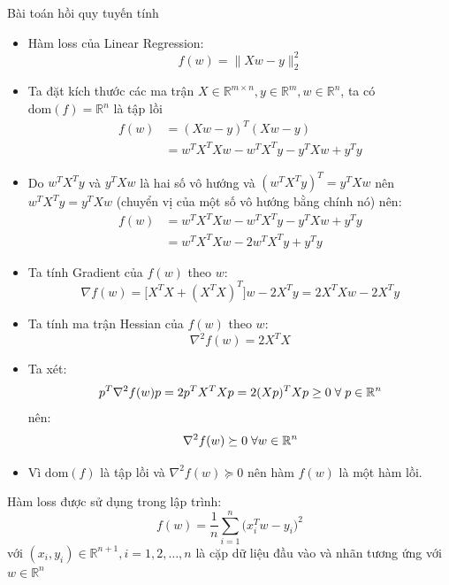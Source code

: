 \documentclass[10pt]{beamer}
\theoremstyle{remark}
\theoremstyle{definition}
\begin{document}
\begin{frame}[allowframebreaks]{Bài toán hồi quy tuyến tính}
	\begin{itemize}
		\item Hàm loss của Linear Regression:
		\begin{equation*}
			f(w) = \lVert X w - y \rVert_2^2
		\end{equation*}
		\item Ta đặt kích thước các ma trận $X \in \mathbb{R}^{m \times n}, y \in \mathbb{R}^m, w \in \mathbb{R}^n$, ta có $\mathrm{dom}(f)=\mathbb{R}^{n}$ là tập lồi
		\begin{equation*}
			\begin{aligned}
				f(w) &= (Xw - y)^T (Xw - y) \\
				&=w^T X^T X w - w^TX^Ty - y^T Xw + y^T y
			\end{aligned}
		\end{equation*}
		\item Do $w^TX^Ty$ và $y^TXw$ là hai số vô hướng và $(w^TX^Ty)^T=y^TXw$ nên $w^TX^Ty=y^TXw$ (chuyển vị của một số vô hướng bằng chính nó) nên:
		\begin{equation*}
			\begin{aligned}
				f(w) &= w^T X^T X w - w^TX^Ty - y^T Xw + y^T y\\
				&=w^T X^T X w-2w^TX^Ty+y^Ty
			\end{aligned}
		\end{equation*}
		\item Ta tính Gradient của $f(w)$ theo $w$:
		\begin{equation*}
			\nabla f(w) =\Big\lbrack X^TX + (X^TX)^T \Big\rbrack w - 2X^Ty = 2X^T X w - 2 X^T y
		\end{equation*}
		\item Ta tính ma trận Hessian của $f(w)$ theo $w$:
		\begin{equation*}
			\nabla^2 f(w) = 2X^T X
		\end{equation*}
		\item Ta xét:
		\begin{equation*}
			p^T \nabla^2 f(w) p = 2 p^T X^T X p = 2 (Xp)^TXp \geq 0 \thickspace\forall \thickspace p \in \mathbb{R}^{n}
		\end{equation*}
		nên:
		\begin{equation*}
			\nabla^2 f(w) \succeq 0 \thickspace \forall w \in \mathbb{R}^{n}
		\end{equation*}
		\item Vì $\mathrm{dom}(f)$ là tập lồi và $\nabla^2 f(w) \succeq 0$ nên hàm $f(w)$ là một hàm lồi.
	\end{itemize}
	Hàm loss được sử dụng trong lập trình:
	\begin{equation*}
		f(w) = \dfrac{1}{n}\sum_{i=1}^{n}\Big( x_i^T w - y_i \Big)^2
	\end{equation*}
	với $(x_i, y_i) \in \mathbb{R}^{n+1}, i=1, 2, \dots, n$ là cặp dữ liệu đầu vào và nhãn tương ứng với $w \in \mathbb{R}^n$
	

\end{frame}
\end{document}
